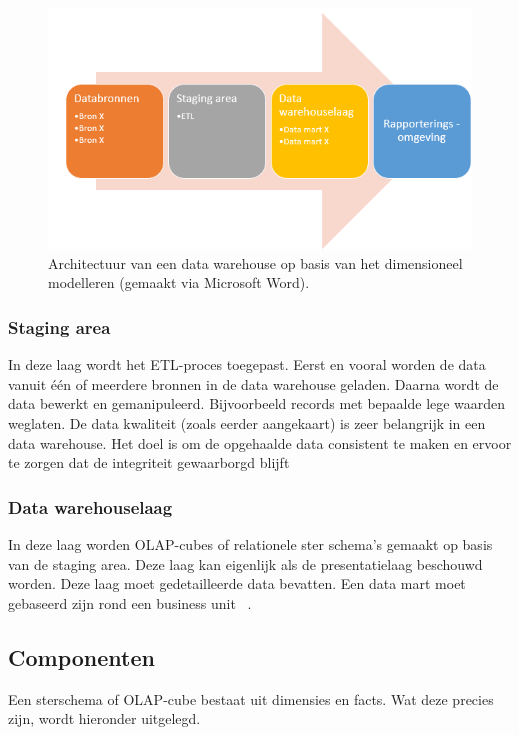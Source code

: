 \begin{figure}[h]
	\centering
	\includegraphics[scale=0.8]{../images/dimmodel.PNG}
	\caption{Architectuur van een data warehouse op basis van het dimensioneel modelleren (gemaakt via Microsoft Word).}
	\label{fig:dimmodel}
\end{figure}

\subsubsection{Staging area}
\label{sec:stagingarea}
In deze laag wordt het ETL-proces toegepast. Eerst en vooral worden de data vanuit één of meerdere bronnen in de data warehouse geladen. Daarna wordt de data bewerkt en gemanipuleerd. Bijvoorbeeld records met bepaalde lege waarden weglaten. De data kwaliteit (zoals eerder aangekaart) is zeer belangrijk in een data warehouse. Het doel is om de opgehaalde data consistent te maken en ervoor te zorgen dat de integriteit gewaarborgd blijft ~\autocite{Kimball2013}

\pagebreak

\subsubsection{Data warehouselaag}
In deze laag worden OLAP-cubes of relationele ster schema's gemaakt op basis van de staging area. Deze laag kan eigenlijk als de presentatielaag beschouwd worden. Deze laag moet gedetailleerde data bevatten. Een data mart moet gebaseerd zijn rond een business unit ~\autocite{Kimball2013}.

\subsection{Componenten}
Een sterschema of OLAP-cube bestaat uit dimensies en facts. Wat deze precies zijn, wordt hieronder uitgelegd. 

